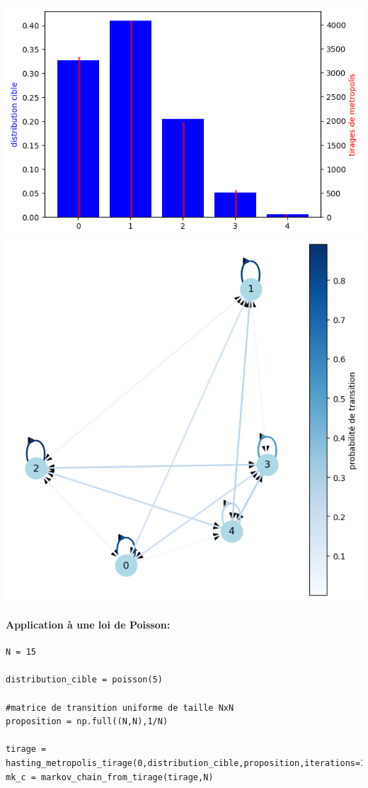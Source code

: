 \documentclass{article}
\begin{document}
\includegraphics[scale=0.25]{loi bin.png}
\includegraphics[scale=0.25]{loi bin graph.png}

\newpage
\paragraph{Application à une loi de Poisson:}

\begin{verbatim}
N = 15

distribution_cible = poisson(5)

#matrice de transition uniforme de taille NxN
proposition = np.full((N,N),1/N)

tirage = hasting_metropolis_tirage(0,distribution_cible,proposition,iterations=100_000)
mk_c = markov_chain_from_tirage(tirage,N)
\end{verbatim}
\end{document}
